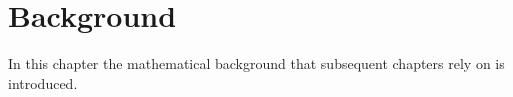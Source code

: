\chapter{Background}\label{sec:chapter2}

In this chapter the mathematical background that subsequent chapters rely on is introduced.
